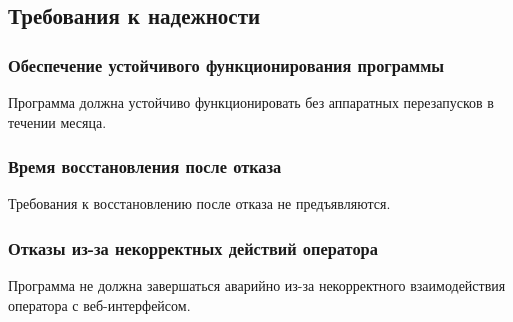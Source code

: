 \subsection{Требования к надежности}
\subsubsection{Обеспечение устойчивого функционирования программы}
Программа должна устойчиво функционировать без аппаратных перезапусков в течении месяца.

\subsubsection{Время восстановления после отказа}
Требования к восстановлению после отказа не предъявляются.

\subsubsection{Отказы из-за некорректных действий оператора}
Программа не должна завершаться аварийно из-за некорректного взаимодействия оператора с веб-интерфейсом.

